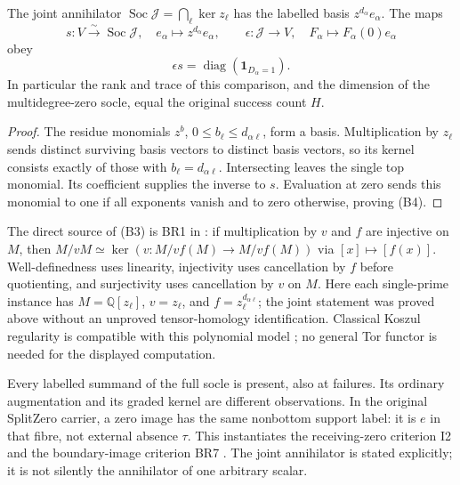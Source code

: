 \begin{theorem}
The joint annihilator $\operatorname{Soc}\mathcal J=\bigcap_\ell\ker z_\ell$
has the labelled basis $z^{d_\alpha}e_\alpha$. The maps
\[
 s:V\xrightarrow{\sim}\operatorname{Soc}\mathcal J,
 \quad e_\alpha\mapsto z^{d_\alpha}e_\alpha,\qquad
 \epsilon:\mathcal J\to V,\quad F_\alpha\mapsto F_\alpha(0)e_\alpha
 \tag{B3}
\]
obey
\[
 \boxed{\epsilon s=\operatorname{diag}(\mathbf1_{D_\alpha=1}).}
 \tag{B4}
\]
In particular the rank and trace of this comparison, and the dimension of the
multidegree-zero socle, equal the original success count $H$.
\end{theorem}
\begin{proof}
The residue monomials $z^b$, $0\le b_\ell\le d_{\alpha\ell}$, form a basis.
Multiplication by $z_\ell$ sends distinct surviving basis vectors to distinct
basis vectors, so its kernel consists exactly of those with
$b_\ell=d_{\alpha\ell}$. Intersecting leaves the single top monomial.
Its coefficient supplies the inverse to $s$. Evaluation at zero sends this
monomial to one if all exponents vanish and to zero otherwise, proving (B4).
\end{proof}

The direct source of (B3) is BR1 in \cite{SZ30}: if multiplication by $v$ and
$f$ are injective on $M$, then
$M/vM\simeq\ker(v:M/vf(M)\to M/vf(M))$ via $[x]\mapsto[f(x)]$.
Well-definedness uses linearity, injectivity uses cancellation by $f$ before
quotienting, and surjectivity uses cancellation by $v$ on $M$.
Here each single-prime instance has $M=\mathbb Q[z_\ell]$,
$v=z_\ell$, and $f=z_\ell^{d_{\alpha\ell}}$; the joint statement was proved
above without an unproved tensor-homology identification. Classical Koszul
regularity is compatible with this polynomial model \cite{Stacks}; no general
Tor functor is needed for the displayed computation.

Every labelled summand of the full socle is present, also at failures. Its
ordinary augmentation and its graded kernel are different observations.
In the original SplitZero carrier, a zero image has the same nonbottom support
label: it is $e$ in that fibre, not external absence $\tau$. This instantiates
the receiving-zero criterion I2 and the boundary-image criterion BR7
\cite{SZ28,SZ30}. The joint annihilator is stated explicitly; it is not silently
the annihilator of one arbitrary scalar.

